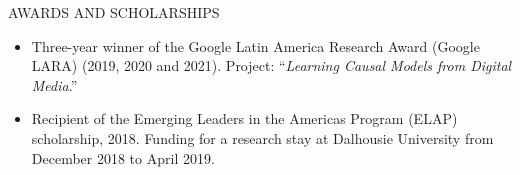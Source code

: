 \documentclass{resume} %
\begin{document}



\begin{rSection}{AWARDS AND SCHOLARSHIPS} 
\begin{itemize}
    \item Three-year winner of the Google Latin America Research Award (Google LARA) (2019, 2020 and 2021). Project: ``\textit{Learning Causal Models from Digital Media}.''
    \vspace{-0.2cm}
    \item Recipient of the Emerging Leaders in the Americas Program (ELAP) scholarship, 2018. Funding for a research stay at Dalhousie University from December 2018 to April 2019.
\end{itemize}

\end{rSection}


\end{document}
